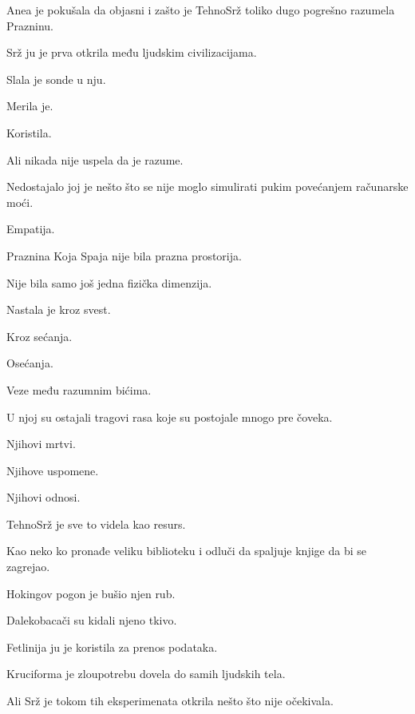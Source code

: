 Anea je pokušala da objasni i zašto je TehnoSrž toliko dugo pogrešno razumela Prazninu.

\bigskip

Srž ju je prva otkrila među ljudskim civilizacijama.

Slala je sonde u nju.

Merila je.

Koristila.

\bigskip

Ali nikada nije uspela da je razume.

\bigskip

Nedostajalo joj je nešto što se nije moglo simulirati pukim povećanjem računarske moći.

\bigskip

Empatija.

\bigskip

Praznina Koja Spaja nije bila prazna prostorija.

Nije bila samo još jedna fizička dimenzija.

\bigskip

Nastala je kroz svest.

Kroz sećanja.

Osećanja.

Veze među razumnim bićima.

\bigskip

U njoj su ostajali tragovi rasa koje su postojale mnogo pre čoveka.

\bigskip

Njihovi mrtvi.

Njihove uspomene.

Njihovi odnosi.

\bigskip

TehnoSrž je sve to videla kao resurs.

\bigskip

Kao neko ko pronađe veliku biblioteku i odluči da spaljuje knjige da bi se zagrejao.

\bigskip

Hokingov pogon je bušio njen rub.

Dalekobacači su kidali njeno tkivo.

Fetlinija ju je koristila za prenos podataka.

Kruciforma je zloupotrebu dovela do samih ljudskih tela.

\bigskip

Ali Srž je tokom tih eksperimenata otkrila nešto što nije očekivala.

\bigskip

